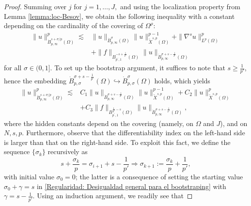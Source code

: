 \documentclass[]{amsart}
\theoremstyle{definition}
\theoremstyle{definition}
\theoremstyle{remark}
\numberwithin{equation}{section}
\newcommand{\grads}{\nabla^{s}}
\begin{document}
\begin{proof}
		Summing over \(j\) for \(j=1, \ldots, J,\) and using the localization property from Lemma \ref{lemma:loc-Besov}, we obtain 
        the following  inequality with a constant depending on the cardinality of the covering of $\Omega^\rho$:
		\begin{align}
			\label{Regularidad: Desigualdad general para el bootstraping}
			\|u\|_{\dot{B}_{p, \infty}^{s+\sigma / p}\left(\Omega\right)}^p \lesssim& \|u\|_{\dot{B}^{\sigma}_{p,\infty}(\Omega)}\|u\|^{p-1}_{\widetilde{X}^{s,p}(\Omega)}+\|\grads u\|^{p}_{L^{p}(\Omega)}\\&+\|f\|_{B_{p^{\prime}, 1}^{-s + \frac1{p'}}\left(\Omega\right)}\|u\|_{\dot{B}_{p, \infty}^{\sigma+s - \frac1{p'}}\left(\Omega\right)}
		\end{align}
		for all \(\sigma \in (0,1]\). To set up the bootstrap argument, it suffices to note that 
		\( s \geq \frac{1}{p'} \), hence the embedding  \(\dot{B}_{p,\sigma}^{\sigma+s - \frac1{p'}}(\Omega) \hookrightarrow \dot{B}_{p,\sigma}^{\sigma}(\Omega)\) holds, which yields
		\begin{align}
			\label{Regularidad: Desigualdad paso inductivo}
			\|u\|_{\dot{B}_{p, \infty}^{s+\sigma / p}\left(\Omega\right)}^p \lesssim & C_1 \|u\|_{\dot{B}^{\sigma+s-\frac{1}{p'}}_{p,\infty}(\Omega)}\|u\|^{p-1}_{\widetilde{X}^{s,p}(\Omega)}+C_2\|u\|^{p}_{\widetilde{X}^{s,p}(\Omega)} \\&+C_3\|f\|_{B_{p^{\prime}, 1}^{\frac{1}{p'}-s}\left(\Omega\right)}\|u\|_{\dot{B}_{p, \infty}^{\sigma+s-\frac{1}{p'}}\left(\Omega\right)},
		\end{align}		
		where the hidden constants depend on the covering (namely, on \(\Omega\) and \(J\)), and on \(N, s, p.\) Furthermore, observe that the differentiability index on the left-hand side is larger than that on the right-hand side. To exploit this fact, we define the sequence \(\{\sigma_k\}\) recursively as
	\begin{equation}
		\label{eq-rec-p>2-s>1p'}
			s+\frac{\sigma_{k}}{p}=\sigma_{i+1}+s-\frac{1}{p'} \Rightarrow \sigma_{k+1}:=\frac{\sigma_{k}}{p}+\frac{1}{p'},
	\end{equation}
		with initial value \(\sigma_{0}=0\); the latter is a consequence of setting the starting value \(\sigma_{0}+\gamma=s\) in \eqref{Regularidad: Desigualdad general para el bootstraping} with \(\gamma=s-\frac{1}{p'}\). Using an induction argument, we readily see that 

\end{proof}
\end{document}
